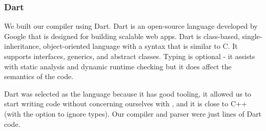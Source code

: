 
\subsubsection{Dart}
We built our compiler using Dart\cite{dartlang}.
Dart is an open-source language developed by Google that is
designed for building scalable web apps. Dart is class-based,
single-inheritance,
object-oriented language with a syntax that is similar to C. It supports
interfaces, generics, and abstract classes. Typing is optional - it assists
with static analysis and dynamic runtime checking but it does affect the
semantics of the code.

Dart was selected as the language because it has good tooling, it allowed
	us to start writing code without concerning ourselves with ,
	and it is close to C++ (with the option to ignore types).
Our compiler and parser were just  lines of Dart code.

